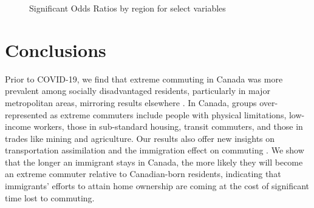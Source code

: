 \documentclass[10 pt,letterpaper]{article}
\begin{document}
\begin{figure}[H]
	\centering
	\caption{Significant Odds Ratios by region for select variables}
	\label{fig:CMA_Results_ORs}
\end{figure}


\section{Conclusions}

Prior to COVID-19, we find that extreme commuting in Canada was more prevalent among socially disadvantaged residents, particularly in major metropolitan areas, mirroring results elsewhere \cite{marion_comparison_2007,bai_exploring_2020}. In Canada, groups over-represented as extreme commuters include people with physical limitations, low-income workers, those in sub-standard housing, transit commuters, and those in trades like mining and agriculture. Our results also offer new insights on transportation assimilation and the immigration effect on commuting \cite{newbold_immigrant_2017,harun_immigrant_2021, Axisa_2012}. We show that the longer an immigrant stays in Canada, the more likely they will become an extreme commuter relative to Canadian-born residents, indicating that immigrants' efforts to attain home ownership are coming at the cost of significant time lost to commuting. 
\end{document}
